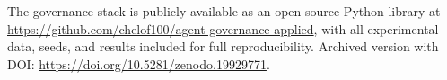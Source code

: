 \documentclass[11pt]{article}
\begin{document}
The governance stack is publicly available as an open-source Python library
at \url{https://github.com/chelof100/agent-governance-applied}, with
all experimental data, seeds, and results included for full reproducibility.
Archived version with DOI: \url{https://doi.org/10.5281/zenodo.19929771}.



\end{document}
